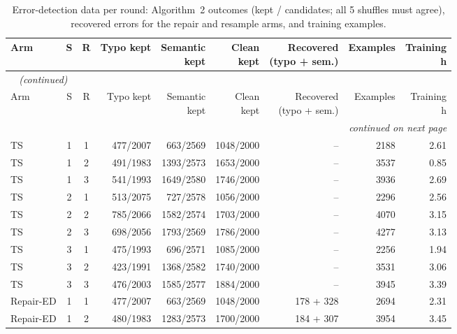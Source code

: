 {\small
{}
\setlength{\tabcolsep}{4.2pt}
\begin{longtable}{@{}lccrrrrrr@{}}
\caption{Error-detection data per round: Algorithm~2 outcomes (kept / candidates; all 5 shuffles must agree), recovered errors for the repair and resample arms, and training examples.}\label{tab:gen-ed-rounds}\\
\toprule
\rowcolor{headshade}Arm & S & R & Typo kept & \makecell{Semantic\\kept} & \makecell{Clean\\kept} & \makecell{Recovered\\(typo + sem.)} & Examples & \makecell{Training\\h}\\
\midrule
\endfirsthead
\multicolumn{9}{l}{\textit{\tablename~\thetable{} (continued)}}\\
\toprule
\rowcolor{headshade}Arm & S & R & Typo kept & \makecell{Semantic\\kept} & \makecell{Clean\\kept} & \makecell{Recovered\\(typo + sem.)} & Examples & \makecell{Training\\h}\\
\midrule
\endhead
\midrule
\multicolumn{9}{r}{\textit{continued on next page}}\\
\endfoot
\bottomrule
\endlastfoot
TS & 1 & 1 & 477/2007 & 663/2569 & 1048/2000 & -- & 2188 & 2.61\\
TS & 1 & 2 & 491/1983 & 1393/2573 & 1653/2000 & -- & 3537 & 0.85\\
TS & 1 & 3 & 541/1993 & 1649/2580 & 1746/2000 & -- & 3936 & 2.69\\
TS & 2 & 1 & 513/2075 & 727/2578 & 1056/2000 & -- & 2296 & 2.56\\
TS & 2 & 2 & 785/2066 & 1582/2574 & 1703/2000 & -- & 4070 & 3.15\\
TS & 2 & 3 & 698/2056 & 1793/2569 & 1786/2000 & -- & 4277 & 3.13\\
TS & 3 & 1 & 475/1993 & 696/2571 & 1085/2000 & -- & 2256 & 1.94\\
TS & 3 & 2 & 423/1991 & 1368/2582 & 1740/2000 & -- & 3531 & 3.06\\
TS & 3 & 3 & 476/2003 & 1585/2577 & 1884/2000 & -- & 3945 & 3.39\\
Repair-ED & 1 & 1 & 477/2007 & 663/2569 & 1048/2000 & 178 + 328 & 2694 & 2.31\\
Repair-ED & 1 & 2 & 480/1983 & 1283/2573 & 1700/2000 & 184 + 307 & 3954 & 3.45\\

\end{longtable}}
